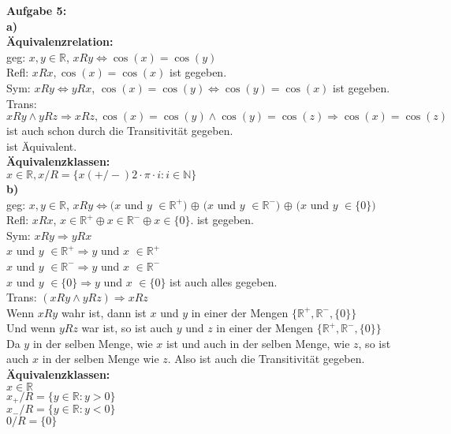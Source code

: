 \documentclass[a4paper]{scrartcl}
\begin{document}
	\begin{flushleft}
		\textbf{Aufgabe 5:}\\
		\textbf{a)}\\
		\textbf{Äquivalenzrelation:}\\
		geg: $x,y\in \mathbb{R}$, $xRy \Leftrightarrow \cos(x) = \cos(y)$\\[1em]
		Refl: $xRx, \cos(x) = \cos(x)$ ist gegeben.\\
		Sym: $xRy\Leftrightarrow yRx$, $\cos(x)=\cos(y)\Leftrightarrow \cos(y)=\cos(x)$ ist gegeben.\\
		Trans: $xRy \wedge yRz\Rightarrow xRz, \cos(x)=\cos(y) \wedge \cos(y)=\cos(z)\Rightarrow \cos(x)=\cos(z)$ ist auch schon durch die Transitivität gegeben.\\
		ist Äquivalent.\\[1em]
		\textbf{Äquivalenzklassen:}\\
		$x\in\mathbb{R}, x/R=\{x(+/-)2\cdot \pi\cdot i:i\in \mathbb{N}\}$\\	[1em]
		\textbf{b)}\\
		geg: $x,y\in\mathbb{R}$, $xRy\Leftrightarrow (x$ und $y$ $\in\mathbb{R^+})$ $\oplus$ $(x$ und $y$ $\in\mathbb{R^-})$ $\oplus$ $(x$ und $y$ $\in\{0\})$\\ [1em]
		 Refl: $xRx$, $x\in\mathbb{R^+}\oplus x\in\mathbb{R^-}\oplus x\in\{0\}$. ist gegeben.\\
		Sym: $xRy\Rightarrow yRx$\\
		$x$ und $y$ $\in\mathbb{R^+}\Rightarrow y$ und $x$ $\in \mathbb{R^+}$\\
		$x$ und $y$ $\in\mathbb{R^-}\Rightarrow y$ und $x$ $\in \mathbb{R^-}$\\
		$x$ und $y$ $\in\{0\}\Rightarrow y$ und $x$ $\in \{0\}$ ist auch alles gegeben.\\
		Trans: $(xRy\wedge yRz)\Rightarrow xRz$\\
		Wenn $xRy$ wahr ist, dann ist $x$ und $y$ in einer der Mengen $\{\mathbb{R^+},\mathbb{R^-},\{0\}\}$\\
		Und wenn $yRz$ war ist, so ist auch $y$ und $z$ in einer der Mengen $\{\mathbb{R^+},\mathbb{R^-},\{0\}\}$\\
		Da $y$ in der selben Menge, wie $x$ ist und auch in der selben Menge, wie $z$, so ist auch $x$ in der selben Menge wie $z$. Also ist auch die Transitivität gegeben.\\[1em]
		\textbf{Äquivalenzklassen:}\\
		$x\in\mathbb{R}$\\
		$x_{+}/R=\{y\in\mathbb{R}:y>0\}$\\
		$x_{-}/R=\{y\in\mathbb{R}:y<0\}$\\
		$0/R=\{0\}$\\
	\end{flushleft}
\end{document}
